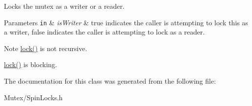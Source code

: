 Locks the mutex as a writer or a reader. 


\begin{DoxyParams}[1]{Parameters}
\mbox{\tt in}  & {\em is\-Writer} & true indicates the caller is attempting to lock this as a writer, false indicates the caller is attempting to lock as a reader. \\
\hline
\end{DoxyParams}
\begin{DoxyNote}{Note}
\hyperlink{class_d_x_1_1_spin_r_w_mutex_a8fe3a96117f0c9594135747f12548add}{lock()} is not recursive. 

\hyperlink{class_d_x_1_1_spin_r_w_mutex_a8fe3a96117f0c9594135747f12548add}{lock()} is blocking. 
\end{DoxyNote}


The documentation for this class was generated from the following file\-:\begin{DoxyCompactItemize}
\item 
Mutex/Spin\-Locks.\-h\end{DoxyCompactItemize}
